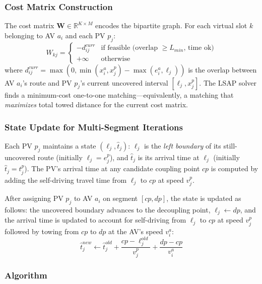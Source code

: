 \documentclass[conference]{IEEEtran}
\begin{document}
\subsubsection{Cost Matrix Construction}
\label{sec:costmatrix}

The cost matrix $\mathbf{W} \in \mathbb{R}^{K \times M}$ encodes the bipartite graph. For each virtual slot $k$ belonging to AV $a_i$ and each PV $p_j$:
\begin{equation}
W_{kj} = \begin{cases}
-d_{ij}^{curr} & \text{if feasible (overlap } \geq L_{min}\text{, time ok)} \\
+\infty & \text{otherwise}
\end{cases}
\end{equation}
where $d_{ij}^{curr} = \max(0, \min(x_i^a, x_j^p) - \max(e_i^a, \ell_j))$ is the overlap between AV $a_i$'s route and PV $p_j$'s current uncovered interval $[\ell_j, x_j^p]$. The LSAP solver finds a minimum-cost one-to-one matching---equivalently, a matching that \textit{maximizes} total towed distance for the current cost matrix.

\subsubsection{State Update for Multi-Segment Iterations}
Each PV $p_j$ maintains a state $(\ell_j, \hat{t}_j)$: $\ell_j$ is the \emph{left boundary} of its still-uncovered route (initially $\ell_j = e_j^p$), and $\hat{t}_j$ is its arrival time at $\ell_j$ (initially $\hat{t}_j = t_j^p$). The PV's arrival time at any candidate coupling point $cp$ is computed by adding the self-driving travel time from $\ell_j$ to $cp$ at speed $v_j^p$.

After assigning PV $p_j$ to AV $a_i$ on segment $[cp, dp]$, the state is updated as follows: the uncovered boundary advances to the decoupling point, $\ell_j \leftarrow dp$, and the arrival time is updated to account for self-driving from $\ell_j$ to $cp$ at speed $v_j^p$ followed by towing from $cp$ to $dp$ at the AV's speed $v_i^a$:
\begin{equation}
    \hat{t}_j^{new} \leftarrow \hat{t}_j^{old} + \frac{cp - \ell_j^{old}}{v_j^p} + \frac{dp - cp}{v_i^a}
    \label{eq:state_update}
\end{equation}

\subsubsection{Algorithm}
\end{document}
